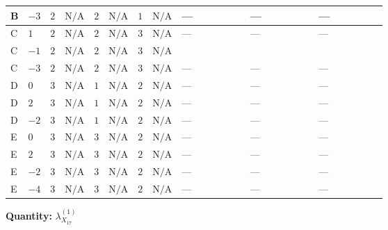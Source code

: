 \documentclass[8pt]{article}
\begin{document}
\begin{landscape}
\begin{longtable}{@{}llcccccc >{\raggedright\arraybackslash}p{0.21\linewidth} >{\raggedright\arraybackslash}p{0.21\linewidth} >{\raggedright\arraybackslash}p{0.21\linewidth}@{}}
\midrule
B & $-3$ & $2$ & $\text{N/A}$ & $2$ & $\text{N/A}$ & $1$ & $\text{N/A}$ & --- & --- & --- \\
\midrule
C & $1$ & $2$ & $\text{N/A}$ & $2$ & $\text{N/A}$ & $3$ & $\text{N/A}$ & --- & --- & --- \\
\midrule
C & $-1$ & $2$ & $\text{N/A}$ & $2$ & $\text{N/A}$ & $3$ & $\text{N/A}$ & \scriptsize\adjustbox{max width=\linewidth}{$\begin{gathered} -3 {g_1}^2 {\lambda_{X_{17}}^{(1)}}\end{gathered}$} & \scriptsize\adjustbox{max width=\linewidth}{$\begin{gathered} +2 {\lambda_{12}^{(1)}} {\lambda_{X_{17}}^{(1)}}\end{gathered}$} & \scriptsize\adjustbox{max width=\linewidth}{$\begin{gathered} +{\lambda_{12}^{(A)}} \left({\lambda_{H H^\dagger S_1^\dagger S_2^\dagger}^{\rm Cross}}-\frac{{\lambda_{X_{17}}^{(1)}}}{2}\right)\end{gathered}$} \\
\midrule
C & $-3$ & $2$ & $\text{N/A}$ & $2$ & $\text{N/A}$ & $3$ & $\text{N/A}$ & --- & --- & --- \\
\midrule
D & $0$ & $3$ & $\text{N/A}$ & $1$ & $\text{N/A}$ & $2$ & $\text{N/A}$ & --- & --- & --- \\
\midrule
D & $2$ & $3$ & $\text{N/A}$ & $1$ & $\text{N/A}$ & $2$ & $\text{N/A}$ & --- & --- & --- \\
\midrule
D & $-2$ & $3$ & $\text{N/A}$ & $1$ & $\text{N/A}$ & $2$ & $\text{N/A}$ & --- & --- & --- \\
\midrule
E & $0$ & $3$ & $\text{N/A}$ & $3$ & $\text{N/A}$ & $2$ & $\text{N/A}$ & --- & --- & --- \\
\midrule
E & $2$ & $3$ & $\text{N/A}$ & $3$ & $\text{N/A}$ & $2$ & $\text{N/A}$ & --- & --- & --- \\
\midrule
E & $-2$ & $3$ & $\text{N/A}$ & $3$ & $\text{N/A}$ & $2$ & $\text{N/A}$ & --- & --- & --- \\
\midrule
E & $-4$ & $3$ & $\text{N/A}$ & $3$ & $\text{N/A}$ & $2$ & $\text{N/A}$ & --- & --- & --- \\
\midrule
\bottomrule
\end{longtable}
\clearpage
\noindent\textbf{Quantity: }${\lambda_{X_{17}}^{(1)}}$\par\smallskip

\end{landscape}
\end{document}
